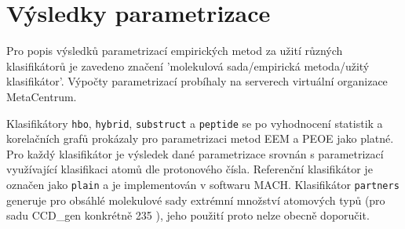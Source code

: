 \section{Výsledky parametrizace}
Pro popis výsledků parametrizací empirických metod za užití různých klasifikátorů je zavedeno značení 'molekulová sada/empirická metoda/užitý klasifikátor'. Výpočty  parametrizací probíhaly na serverech virtuální organizace MetaCentrum. 

Klasifikátory \verb|hbo|, \verb|hybrid|, \verb|substruct| a \verb|peptide| se po vyhodnocení statistik a korelačních grafů prokázaly pro parametrizaci metod EEM a PEOE jako platné. 
Pro každý klasifikátor je výsledek dané parametrizace srovnán s parametrizací využívající klasifikaci atomů dle protonového čísla. Referenční klasifikátor je označen jako \verb|plain| a je implementován v softwaru MACH. Klasifikátor \verb|partners| generuje pro obsáhlé molekulové sady extrémní množství atomových typů (pro sadu CCD\_gen konkrétně 235%
), jeho použití proto nelze obecně doporučit. 

